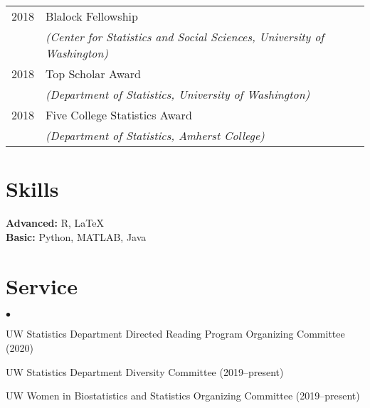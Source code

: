 \documentclass[margin,centered]{res}
\newenvironment{list1}{
  \begin{list}{\ding{113}}{%
      \setlength{\itemsep}{0in}
      \setlength{\parsep}{0in} \setlength{\parskip}{0in}
      \setlength{\topsep}{0in} \setlength{\partopsep}{0in}
      \setlength{\leftmargin}{0.17in}}}{\end{list}}
\newenvironment{list2}{
  \begin{list}{$\bullet$}{%
      \setlength{\itemsep}{0in}
      \setlength{\parsep}{0in} \setlength{\parskip}{0in}
      \setlength{\topsep}{0in} \setlength{\partopsep}{0in}
      \setlength{\leftmargin}{0.2in}}}{\end{list}}
\begin{document}
\begin{resume}
\begin{tabular}{@{}p{0.8in}p{4in}}
2018 & Blalock Fellowship \\
&\textit{(Center for Statistics and Social Sciences, University of Washington)}\\
2018 & Top Scholar Award\\
&\textit{(Department of Statistics, University of Washington)}\\
2018 & Five College Statistics Award \\
&\textit{(Department of Statistics, Amherst College)}
\end{tabular}

\section{\sc Skills}
{\bf Advanced:} R, LaTeX\\
{\bf Basic:} Python, MATLAB, Java


\section{\sc Service}

\begin{list1}
\item[]
\begin{list2}
\vspace*{.05in}
\item UW Statistics Department Directed Reading Program Organizing Committee (2020)
\item UW Statistics Department Diversity Committee (2019--present)
\item UW Women in Biostatistics and Statistics Organizing Committee (2019--present)
\end{list2}
\end{list1}






%
\thispagestyle{lastpage}
\end{resume}
\end{document}
